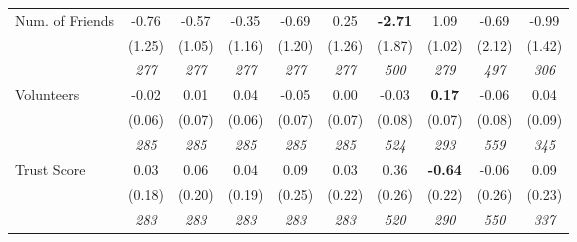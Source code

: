 \begin{tabular}{l c c c c c c c c c}
Num. of Friends & -0.76 & -0.57 & -0.35 & -0.69 & 0.25 & \textbf{ -2.71 } & 1.09 & -0.69 & -0.99 \\
& (1.25) & (1.05) & (1.16) & (1.20) & (1.26) & (1.87) & (1.02) & (2.12) & (1.42) \\
& \textit{ 277 } & \textit{ 277 } & \textit{ 277 } & \textit{ 277 } & \textit{ 277 } & \textit{ 500 } & \textit{ 279 } & \textit{ 497 } & \textit{ 306 } \\
Volunteers & -0.02 & 0.01 & 0.04 & -0.05 & 0.00 & -0.03 & \textbf{0.17} & -0.06 & 0.04 \\
& (0.06) & (0.07) & (0.06) & (0.07) & (0.07) & (0.08) & (0.07) & (0.08) & (0.09) \\
& \textit{ 285 } & \textit{ 285 } & \textit{ 285 } & \textit{ 285 } & \textit{ 285 } & \textit{ 524 } & \textit{ 293 } & \textit{ 559 } & \textit{ 345 } \\
Trust Score & 0.03 & 0.06 & 0.04 & 0.09 & 0.03 & 0.36 & \textbf{-0.64} & -0.06 & 0.09 \\
& (0.18) & (0.20) & (0.19) & (0.25) & (0.22) & (0.26) & (0.22) & (0.26) & (0.23) \\
& \textit{ 283 } & \textit{ 283 } & \textit{ 283 } & \textit{ 283 } & \textit{ 283 } & \textit{ 520 } & \textit{ 290 } & \textit{ 550 } & \textit{ 337 } \\
\bottomrule
\end{tabular}
